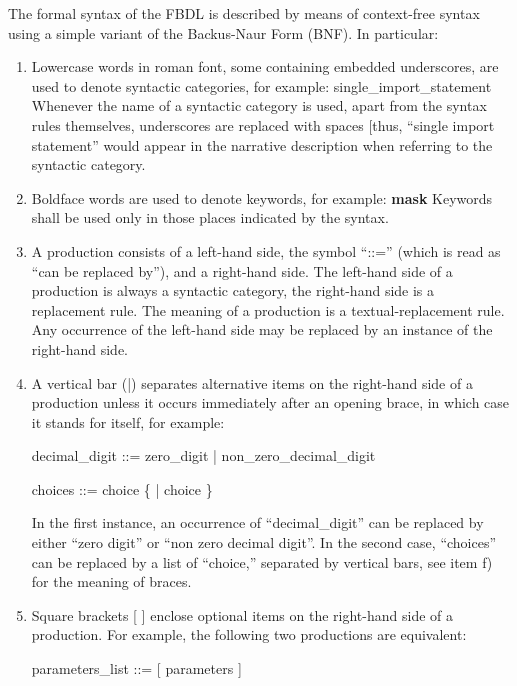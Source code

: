 The formal syntax of the FBDL is described by means of context-free syntax using a simple variant of the Backus-Naur Form (BNF).
In particular:
\begin{enumerate}[label=\alph*)]
	\item
		Lowercase words in roman font, some containing embedded underscores, are used to denote syntactic categories, for example:\n
		single\_import\_statement\n
		Whenever the name of a syntactic category is used, apart from the syntax rules themselves, underscores are replaced with spaces 		[thus, “single import statement” would appear in the narrative description when referring to the syntactic category.
	\item
		Boldface words are used to denote keywords, for example:\n
		\textbf{mask}\n
		Keywords shall be used only in those places indicated by the syntax.
	\item
		A production consists of a left-hand side, the symbol “::=” (which is read as “can be replaced by”), and a right-hand side.
		The left-hand side of a production is always a syntactic category, the right-hand side is a replacement rule.
		The meaning of a production is a textual-replacement rule.
		Any occurrence of the left-hand side may be replaced by an instance of the right-hand side.
	\item
		A vertical bar (|) separates alternative items on the right-hand side of a production unless it occurs immediately after an opening brace, in which case it stands for itself, for example:

		\begin{bnf}
			decimal\_digit ::= zero\_digit | non\_zero\_decimal\_digit
		\end{bnf}

		\begin{bnf}
			choices ::= choice \{ | choice \}
		\end{bnf}

		In the first instance, an occurrence of “decimal\_digit” can be replaced by either “zero digit” or “non zero decimal digit”.
		In the second case, “choices” can be replaced by a list of “choice,” separated by vertical bars, see item f) for the meaning of braces.
	\item
		Square brackets [  ] enclose optional items on the right-hand side of a production.
		For example, the following two productions are equivalent:

		\begin{bnf}
			parameters\_list ::=  \tbf{(} [ parameters ] \tbf{)}
		\end{bnf}


\end{enumerate}
